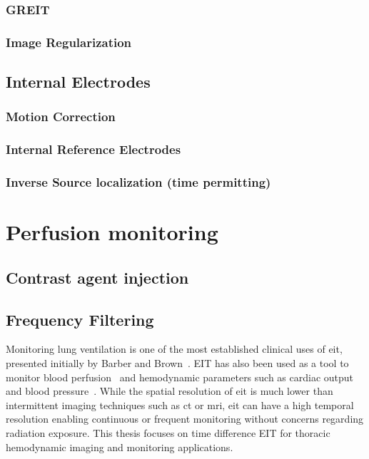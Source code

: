 \subsubsection{GREIT}

\subsubsection{Image Regularization}


\subsection{Internal Electrodes}
\subsubsection{Motion Correction} \label{sec:motion_correction}
\subsubsection{Internal Reference Electrodes}
\subsubsection{Inverse Source localization (time permitting)}










\section{Perfusion monitoring}
\subsection{Contrast agent injection}
\subsection{Frequency Filtering}


Monitoring lung ventilation is one of the most
established clinical uses of 
\acrshort{eit}, presented initially by Barber and Brown~\parencite{Barber1984}.
EIT has also been used as a tool to monitor blood 
perfusion~\parencite{Brown1992} and hemodynamic parameters such as 
cardiac output~\parencite{Braun2018} and blood pressure~\parencite{Sola2011,Proenca2017}. 
While the spatial resolution of \acrshort{eit} is much lower than 
intermittent imaging techniques such as \acrfull{ct} or \acrfull{mri},
\acrshort{eit} can have a high temporal resolution enabling continuous or frequent 
monitoring without concerns regarding radiation exposure.
This thesis focuses on time difference EIT for thoracic hemodynamic imaging and monitoring applications. 

